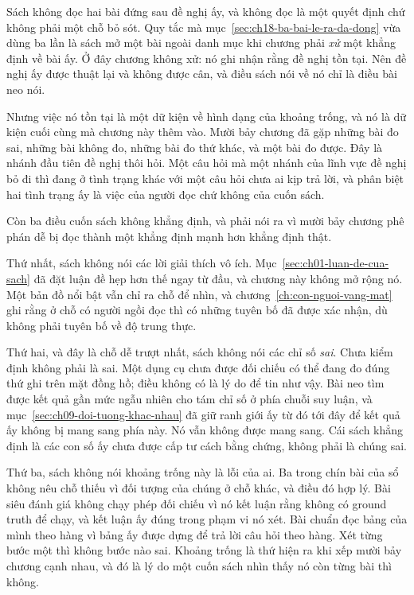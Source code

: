 Sách không đọc hai bài đứng sau đề nghị ấy, và không đọc là một quyết định chứ
không phải một chỗ bỏ sót. Quy tắc mà mục~\ref{sec:ch18-ba-bai-le-ra-da-dong} vừa
dùng ba lần là sách mở một bài ngoài danh mục khi chương phải \emph{xử} một khẳng
định về bài ấy. Ở đây chương không xử: nó ghi nhận rằng đề nghị tồn tại. Nên đề
nghị ấy được thuật lại và không được cân, và điều sách nói về nó chỉ là điều bài
neo nói.

Nhưng việc nó tồn tại là một dữ kiện về hình dạng của khoảng trống, và nó là dữ
kiện cuối cùng mà chương này thêm vào. Mười bảy chương đã gặp những bài đo sai,
những bài không đo, những bài đo thứ khác, và một bài đo được. Đây là nhánh đầu
tiên đề nghị thôi hỏi. Một câu hỏi mà một nhánh của lĩnh vực đề nghị bỏ đi thì
đang ở tình trạng khác với một câu hỏi chưa ai kịp trả lời, và phân biệt hai tình
trạng ấy là việc của người đọc chứ không của cuốn sách.

%
Còn ba điều cuốn sách không khẳng định, và phải nói ra vì mười bảy chương phê
phán dễ bị đọc thành một khẳng định mạnh hơn khẳng định thật.

Thứ nhất, sách không nói các lời giải thích vô ích.
Mục~\ref{sec:ch01-luan-de-cua-sach} đã đặt luận đề hẹp hơn thế ngay từ đầu, và
chương này không mở rộng nó. Một bản đồ nổi bật vẫn chỉ ra chỗ để nhìn, và
chương~\ref{ch:con-nguoi-vang-mat} ghi rằng ở chỗ có người ngồi đọc thì có những
tuyên bố đã được xác nhận, dù không phải tuyên bố về độ trung thực.

Thứ hai, và đây là chỗ dễ trượt nhất, sách không nói các chỉ số \emph{sai}. Chưa
kiểm định không phải là sai. Một dụng cụ chưa được đối chiếu có thể đang đo đúng
thứ ghi trên mặt đồng hồ; điều không có là lý do để tin như vậy. Bài neo tìm được
kết quả gần mức ngẫu nhiên cho tám chỉ số ở phía chuỗi suy luận, và
mục~\ref{sec:ch09-doi-tuong-khac-nhau} đã giữ ranh giới ấy từ đó tới đây để kết
quả ấy không bị mang sang phía này. Nó vẫn không được mang sang. Cái sách khẳng
định là các con số ấy chưa được cấp tư cách bằng chứng, không phải là chúng sai.

Thứ ba, sách không nói khoảng trống này là lỗi của ai. Ba trong chín bài của sổ
không nêu chỗ thiếu vì đối tượng của chúng ở chỗ khác, và điều đó hợp lý. Bài
siêu đánh giá không chạy phép đối chiếu vì nó kết luận rằng không có ground truth
để chạy, và kết luận ấy đúng trong phạm vi nó xét. Bài chuẩn đọc bảng của mình
theo hàng vì bảng ấy được dựng để trả lời câu hỏi theo hàng. Xét từng bước một
thì không bước nào sai. Khoảng trống là thứ hiện ra khi xếp mười bảy chương cạnh
nhau, và
đó là lý do một cuốn sách nhìn thấy nó còn từng bài thì không.

